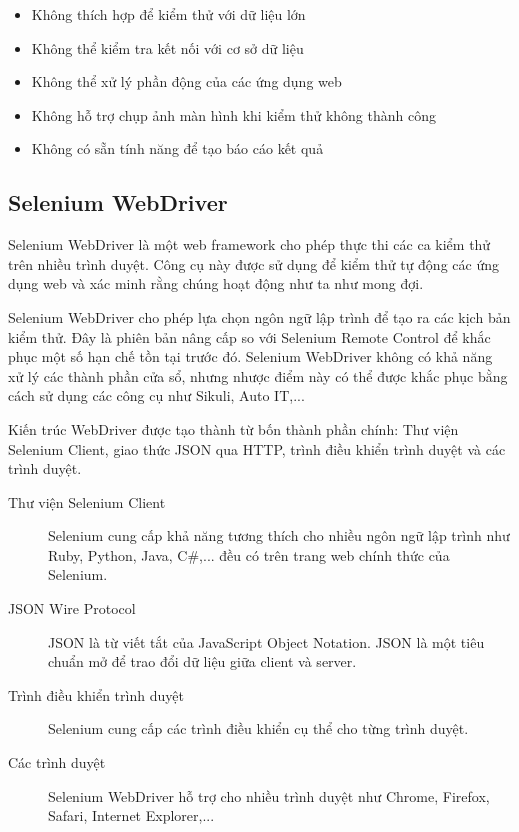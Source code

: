 \documentclass[./../main_file.tex]{subfiles}
\begin{document}
	\begin{itemize}
		\item Không thích hợp để kiểm thử với dữ liệu lớn
		\item Không thể kiểm tra kết nối với cơ sở dữ liệu
		\item Không thể xử lý phần động của các ứng dụng web
		\item Không hỗ trợ chụp ảnh màn hình khi kiểm thử không thành công
		\item Không có sẵn tính năng để tạo báo cáo kết quả
	\end{itemize}
	
	\subsection{Selenium WebDriver}
	
	Selenium WebDriver là một web framework cho phép thực thi các ca kiểm thử trên nhiều trình duyệt. Công cụ này được sử dụng để kiểm thử tự động các ứng dụng web và  xác minh rằng chúng hoạt động như ta như mong đợi.
	
	Selenium WebDriver cho phép lựa chọn ngôn ngữ lập trình để tạo ra các kịch bản kiểm thử. Đây là phiên bản nâng cấp so với Selenium Remote Control để khắc phục một số hạn chế tồn tại trước đó. Selenium WebDriver không có khả năng xử lý các thành phần cửa sổ, nhưng nhược điểm này có thể được khắc phục bằng cách sử dụng các công cụ như Sikuli, Auto IT,...
	
	Kiến trúc WebDriver được tạo thành từ bốn thành phần chính: Thư viện Selenium Client, giao thức JSON qua HTTP, trình điều khiển trình duyệt và các trình duyệt.

	\begin{description}
		\item[Thư viện Selenium Client] Selenium cung cấp khả năng tương thích cho nhiều ngôn ngữ lập trình như Ruby, Python, Java, C\#,... đều có trên trang web chính thức của Selenium.
		\item[JSON Wire Protocol] JSON là từ viết tắt của JavaScript Object Notation. JSON là một tiêu chuẩn mở để trao đổi dữ liệu giữa client và server.
		\item[Trình điều khiển trình duyệt] Selenium cung cấp các trình điều khiển cụ thể cho từng trình duyệt.
		\item[Các trình duyệt] Selenium WebDriver hỗ trợ cho nhiều trình duyệt như Chrome, Firefox, Safari, Internet Explorer,...
	\end{description}
\end{document}

